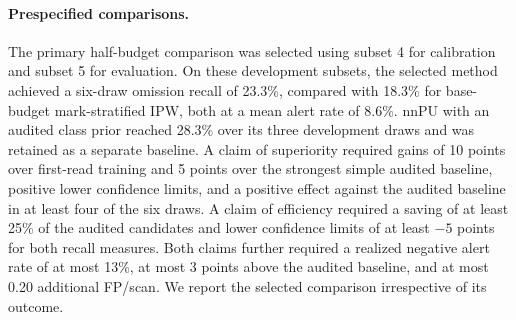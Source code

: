 \begin{table}[t]
\centering\small
\setlength{\tabcolsep}{3.5pt}
\caption{Controlled bookmark cap. Each cell reports detections at the anchor draw among the 151 imposed omissions and all 276 targets, followed by alerts among 105 reference-negative patients. The encoder in this setting is trained on the capped first-read labels.}
\label{tab:cap}

\end{table}

\begin{table}[!t]
\centering\small
\caption{Paired effects at the locked and calibration-matched operating points. Differences are percentage points except FP/scan. Patient intervals use the matched-draw mean.}
\label{tab:contrasts}

\end{table}

\begin{table}[!t]
\centering\small
\caption{Audit allocation and workload, averaged over the matched draws. Candidates: audited candidates; Pos.\ cand.: audited reference-positive candidates; Targets and Omit.: distinct audited targets and omissions; Patients: patients with at least one audit; Exp.\ omit.\ and Exp.\ unmarked: expected reach (Eq.~) over all training omissions and over the 35 omissions without any weak mark.}
\label{tab:costs}

\end{table}

\paragraph{Prespecified comparisons.}
The primary half-budget comparison was selected using subset 4 for calibration and subset 5 for evaluation. On these development subsets, the selected method achieved a six-draw omission recall of 23.3\%, compared with 18.3\% for base-budget mark-stratified IPW, both at a mean alert rate of 8.6\%. nnPU with an audited class prior reached 28.3\% over its three development draws and was retained as a separate baseline. A claim of superiority required gains of 10 points over first-read training and 5 points over the strongest simple audited baseline, positive lower confidence limits, and a positive effect against the audited baseline in at least four of the six draws. A claim of efficiency required a saving of at least 25\% of the audited candidates and lower confidence limits of at least $-5$ points for both recall measures. Both claims further required a realized negative alert rate of at most 13\%, at most 3 points above the audited baseline, and at most 0.20 additional FP/scan. We report the selected comparison irrespective of its outcome.

